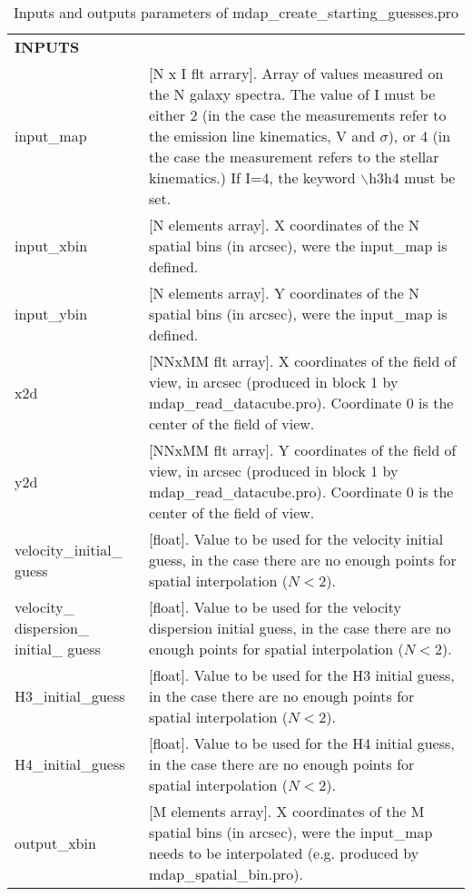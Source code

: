 \documentclass[11pt]{book}
\begin{document}
\begin{center}
\begin{longtable}{p{2.7cm}| p{11.1cm}}
\caption{Inputs and outputs parameters of mdap\_create\_starting\_guesses.pro} \label{dap_tab:mdap_create_starting_guesses} \\
\hline
\endfirsthead
\hline
\endhead
\hline
\endlastfoot
\hline
{\bf  INPUTS} &  \\
%
input\_map    &[N x I flt arrary]. Array of values measured on the N galaxy spectra. The value of I must be either 2 (in the case the measurements refer to the emission line kinematics, V and $\sigma$), or 4 (in the case the measurement refers to the stellar kinematics.) If I=4, the keyword $\backslash$h3h4 must be set. \\
%
input\_xbin   &[N elements array]. X coordinates of the N spatial bins (in arcsec), were the input\_map is defined.\\
%
input\_ybin   &[N elements array]. Y coordinates of the N spatial bins (in arcsec), were the input\_map is defined.\\
%
x2d & [NNxMM flt array]. X coordinates of the field of view, in arcsec (produced in block 1 by mdap\_read\_datacube.pro). 
                        Coordinate 0 is the center of the field of view.\\
%
y2d & [NNxMM flt array]. Y coordinates of the field of view, in arcsec (produced in block 1 by mdap\_read\_datacube.pro). 
                        Coordinate 0 is the center of the field of view.\\
%
velocity\_initial\_ guess & [float]. Value to be used for the velocity initial guess, in the case there are no enough points for spatial interpolation ($N<2$). \\
%
velocity\_ dispersion\_ initial\_ guess & [float]. Value to be used for the velocity dispersion initial guess, in the case there are no enough points for spatial interpolation ($N<2$). \\
%
H3\_initial\_guess & [float].  Value to be used for the H3 initial guess, in the case there are no enough points for spatial interpolation ($N<2$).\\
%
H4\_initial\_guess & [float].  Value to be used for the H4 initial guess, in the case there are no enough points for spatial interpolation ($N<2$). \\
%
output\_xbin &[M elements array]. X coordinates of the M spatial bins (in arcsec), were the input\_map needs to be interpolated (e.g. produced by mdap\_spatial\_bin.pro).\\

\end{longtable}
\end{center}
\end{document}
